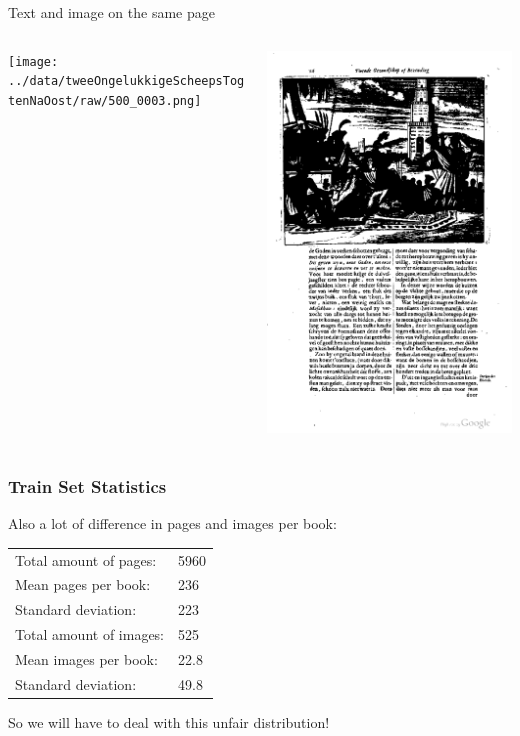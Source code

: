 {
	Text and image on the same page
	\begin{columns}
		\begin{column}{.5\textwidth}
			\texttt{[image: ../data/tweeOngelukkigeScheepsTogtenNaOost/raw/500\_0003.png]}
		\end{column}
		\begin{column}{.5\textwidth}
			\includegraphics[width=.9\columnwidth]{resources/text_and_image_example}
		\end{column}
	\end{columns}
}

\begin{frame}
\frametitle{Train Set Statistics}

Also a lot of difference in pages and images per book:

\begin{center}
\begin{tabular}{l l}
Total amount of pages: & 5960 \\
Mean pages per book: & 236 \\
Standard deviation: & 223 \\
Total amount of images: & 525 \\
Mean images per book: & 22.8 \\
Standard deviation: & 49.8
\end{tabular}
\end{center}

So we will have to deal with this unfair distribution!

\end{frame}

